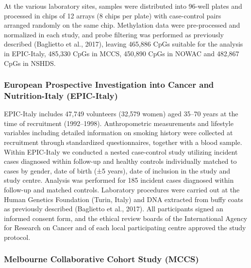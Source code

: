 \documentclass[11pt,twoside]{bristolthesis}
\begin{document}
At the various laboratory sites, samples were distributed into 96-well plates and processed in chips of 12 arrays (8 chips per plate) with case-control pairs arranged randomly on the same chip. Methylation data were pre-processed and normalized in each study, and probe filtering was performed as previously described (Baglietto et al., 2017), leaving 465,886 CpGs suitable for the analysis in EPIC-Italy, 485,330 CpGs in MCCS, 450,890 CpGs in NOWAC and 482,867 CpGs in NSHDS.

\hypertarget{european-prospective-investigation-into-cancer-and-nutrition-italy-epic-italy}{%
\subsubsection{European Prospective Investigation into Cancer and Nutrition-Italy (EPIC-Italy)}\label{european-prospective-investigation-into-cancer-and-nutrition-italy-epic-italy}}

EPIC-Italy includes 47,749 volunteers (32,579 women) aged 35--70 years at the time of recruitment (1992--1998). Anthropometric measurements and lifestyle variables including detailed information on smoking history were collected at recruitment through standardized questionnaires, together with a blood sample. Within EPIC-Italy we conducted a nested case-control study utilizing incident cases diagnosed within follow-up and healthy controls individually matched to cases by gender, date of birth (±5 years), date of inclusion in the study and study centre. Analysis was performed for 185 incident cases diagnosed within follow-up and matched controls. Laboratory procedures were carried out at the Human Genetics Foundation (Turin, Italy) and DNA extracted from buffy coats as previously described (Baglietto et al., 2017). All participants signed an informed consent form, and the ethical review boards of the International Agency for Research on Cancer and of each local participating centre approved the study protocol.

\hypertarget{melbourne-collaborative-cohort-study-mccs}{%
\subsubsection{Melbourne Collaborative Cohort Study (MCCS)}\label{melbourne-collaborative-cohort-study-mccs}}
\end{document}
